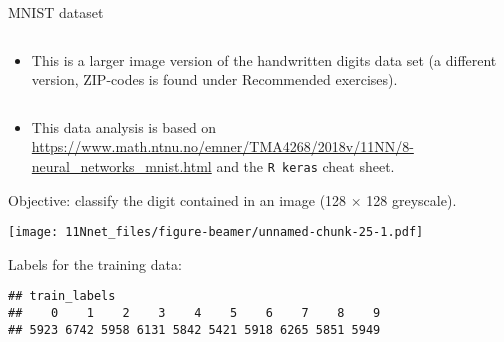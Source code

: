 \documentclass[10pt,ignorenonframetext,]{beamer}
\providecommand{\tightlist}{%
  \setlength{\itemsep}{0pt}\setlength{\parskip}{0pt}}
\begin{document}
\begin{frame}[fragile]

\begin{block}{MNIST dataset}

\(~\)

\begin{itemize}
\tightlist
\item
  This is a larger image version of the handwritten digits data set (a
  different version, ZIP-codes is found under Recommended exercises).
\end{itemize}

\(~\)

\begin{itemize}
\tightlist
\item
  This data analysis is based on
  \url{https://www.math.ntnu.no/emner/TMA4268/2018v/11NN/8-neural_networks_mnist.html}
  and the \texttt{R\ keras} cheat sheet.
\end{itemize}

\end{block}

\end{frame}

\begin{frame}

Objective: classify the digit contained in an image (128 \(\times\) 128
greyscale).

\scriptsize

\texttt{[image: 11Nnet\_files/figure-beamer/unnamed-chunk-25-1.pdf]}

\end{frame}

\begin{frame}[fragile]

Labels for the training data:

\scriptsize

\begin{verbatim}
## train_labels
##    0    1    2    3    4    5    6    7    8    9 
## 5923 6742 5958 6131 5842 5421 5918 6265 5851 5949
\end{verbatim}

\end{frame}
\end{document}
